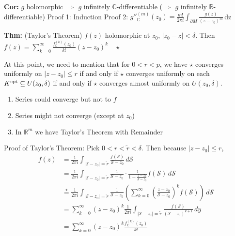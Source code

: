 \documentclass[10pt,letterpaper]{article}
\newcommand{\n}{\hfill\break}
\newcommand{\thm}[1]{\par\noindent\settowidth{\hangindent}{\textbf{Thm: }}\textbf{Thm: }#1\n}
\newcommand{\cor}[1]{\par\noindent\settowidth{\hangindent}{\textbf{Cor: }}\textbf{Cor: }#1\n}
\newcommand{\ptxt}[1]{\textrm{\textnormal{#1}}}
\newcommand{\reals}{\mathbb{R}}
\newcommand{\R}{\reals}
\newcommand{\complex}{\mathbb{C}}
\newcommand{\C}{\complex}
\newcommand{\abs}[1]{\left|#1\right|}
\newcommand{\paren}[1]{\left(#1\right)}
\begin{document}
\cor{$g$ holomorphic $\Rightarrow$ $g$ infinitely $\C$-differentiable ($\Rightarrow$ $g$ infinitely $\R$-differentiable)\n
Proof 1: Induction\n
Proof 2: $\displaystyle{}g''^{(m)}_{\C}(z_{0})=\frac{m!}{2\pi{}i}\int_{\partial{}M}\frac{g(z)}{(z-z_{0})^{m}}$\,dz}

\thm{(Taylor's Theorem) $f(z)$ holomorphic at $z_{0}$, $\abs{z_{0}-z}<\delta$. Then $\displaystyle{}f(z)=\sum_{k=0}^{\infty}\frac{f^{(k)}_{\C}(z_{0})}{k!}(z-z_{0})^{k}\quad\star$}

\par\noindent At this point, we need to mention that for $0<r<p$, we have $\star$ converges uniformly on $\abs{z-z_{0}}\le{}r$ if and only if $\star$ converges uniformly on each $K^{\ptxt{cpt}}\subseteq{}U(z_{0},\delta)$ if and only if $\star$ converges almost uniformly on $U(z_{0},\delta)$.\n

\begin{enumerate}
	\item Series could converge but not to $f$
	\item Series might not converge (except at $z_{0}$)
	\item In $\R^{m}$ we have Taylor's Theorem with Remainder
\end{enumerate}

\par\noindent Proof of Taylor's Theorem: Pick $0<r<\tilde{r}<\delta$. Then because $\abs{z-z_{0}}\le{}r$,
\begin{align*}
	f(z) & =\frac{1}{2\pi{}i}\int_{\abs{\mathscr{S}-z_{0}}=\tilde{r}}\frac{f(\mathscr{S})}{\mathscr{S}-z_{0}}\,d\mathscr{S}\\
	& =\frac{1}{2\pi{}i}\int_{\abs{\mathscr{S}-z_{0}}=\tilde{r}}\frac{1}{\mathscr{S}-z_{0}}\cdot\frac{1}{1-\frac{z-z_{0}}{\mathscr{S}-z_{0}}}f(\mathscr{S})\,d\mathscr{S}\\
	& \overset{\star}{=}\frac{1}{2\pi{}i}\int_{\abs{\mathscr{S}-z_{0}}=\tilde{r}}\frac{1}{\mathscr{S}-z_{0}}\paren{\sum_{k=0}^{\infty}\paren{\frac{z-z_{0}}{\mathscr{S}-z_{0}}}^{k}f(\mathscr{S})}\,d\mathscr{S}\\
	& =\sum_{k=0}^{\infty}(z-z_{0})^{k}\frac{1}{2\pi{}i}\int_{\abs{\mathscr{S}-z_{0}}=\tilde{r}}\frac{f(\mathscr{S})}{(\mathscr{S}-z_{0})^{k+1}}\,dy\\
	& =\sum_{k=0}^{\infty}(z-z_{0})^{k}\frac{f^{(k)}_{\C}(z_{0})}{k!}
\end{align*}
\end{document}
